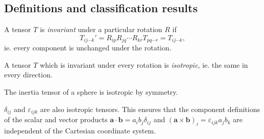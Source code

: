 \documentclass[a4paper]{article}
\begin{document}
\subsection{Definitions and classification results}
\begin{defi}
  A tensor $T$ is \emph{invariant} under a particular rotation $R$ if
  \[
    T_{ij\cdots k}' = R_{ip}R_{jq}\cdots R_{kr}T_{pq\cdots r} = T_{ij\cdots k},
  \]
  ie. every component is unchanged under the rotation.

  A tensor $T$ which is invariant under every rotation is \emph{isotropic}, ie. the same in every direction.
\end{defi}

\begin{eg}
  The inertia tensor of a sphere is isotropic by symmetry.

  $\delta_{ij}$ and $\varepsilon_{ijk}$ are also isotropic tensors. This ensures that the component definitions of the scalar and vector products $\mathbf{a}\cdot \mathbf{b} = a_i b_j \delta_{ij}$ and $(\mathbf{a}\times \mathbf{b})_i = \varepsilon_{ijk} a_j b_k$ are independent of the Cartesian coordinate system.
\end{eg}
\end{document}
